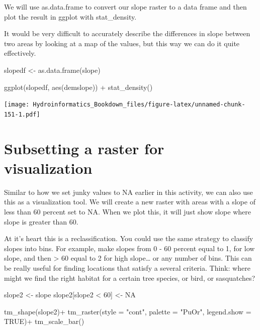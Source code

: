 \documentclass[
]{book}
\newenvironment{Shaded}{\begin{snugshade}}{\end{snugshade}}
\newcommand{\AttributeTok}[1]{\textcolor[rgb]{0.77,0.63,0.00}{#1}}
\newcommand{\ConstantTok}[1]{\textcolor[rgb]{0.00,0.00,0.00}{#1}}
\newcommand{\DecValTok}[1]{\textcolor[rgb]{0.00,0.00,0.81}{#1}}
\newcommand{\FunctionTok}[1]{\textcolor[rgb]{0.00,0.00,0.00}{#1}}
\newcommand{\NormalTok}[1]{#1}
\newcommand{\OtherTok}[1]{\textcolor[rgb]{0.56,0.35,0.01}{#1}}
\newcommand{\SpecialCharTok}[1]{\textcolor[rgb]{0.00,0.00,0.00}{#1}}
\newcommand{\StringTok}[1]{\textcolor[rgb]{0.31,0.60,0.02}{#1}}
\begin{document}
We will use as.data.frame to convert our slope raster to a data frame and then plot the result in ggplot with stat\_density.

It would be very difficult to accurately describe the differences in slope between two areas by looking at a map of the values, but this way we can do it quite effectively.

\begin{Shaded}
\begin{Highlighting}[]
\NormalTok{slopedf }\OtherTok{\textless{}{-}} \FunctionTok{as.data.frame}\NormalTok{(slope)}

\FunctionTok{ggplot}\NormalTok{(slopedf, }\FunctionTok{aes}\NormalTok{(demslope)) }\SpecialCharTok{+}
  \FunctionTok{stat\_density}\NormalTok{()}
\end{Highlighting}
\end{Shaded}

\texttt{[image: Hydroinformatics\_Bookdown\_files/figure-latex/unnamed-chunk-151-1.pdf]}

\hypertarget{subsetting-a-raster-for-visualization}{%
\section{Subsetting a raster for visualization}\label{subsetting-a-raster-for-visualization}}

Similar to how we set junky values to NA earlier in this activity, we can also use this as a visualization tool. We will create a new raster with areas with a slope of less than 60 percent set to NA. When we plot this, it will just show slope where slope is greater than 60.

At it's heart this is a reclassification. You could use the same strategy to classify slopes into bins. For example, make slopes from 0 - 60 percent equal to 1, for low slope, and then \textgreater{} 60 equal to 2 for high slope\ldots{} or any number of bins. This can be really useful for finding locations that satisfy a several criteria. Think: where might we find the right habitat for a certain tree species, or bird, or sasquatches?

\begin{Shaded}
\begin{Highlighting}[]
\NormalTok{slope2 }\OtherTok{\textless{}{-}}\NormalTok{ slope}
\NormalTok{slope2[slope2 }\SpecialCharTok{\textless{}} \DecValTok{60}\NormalTok{] }\OtherTok{\textless{}{-}} \ConstantTok{NA}

\FunctionTok{tm\_shape}\NormalTok{(slope2)}\SpecialCharTok{+}
  \FunctionTok{tm\_raster}\NormalTok{(}\AttributeTok{style =} \StringTok{"cont"}\NormalTok{, }\AttributeTok{palette =} \StringTok{"PuOr"}\NormalTok{, }\AttributeTok{legend.show =} \ConstantTok{TRUE}\NormalTok{)}\SpecialCharTok{+}
  \FunctionTok{tm\_scale\_bar}\NormalTok{()}
\end{Highlighting}
\end{Shaded}
\end{document}
